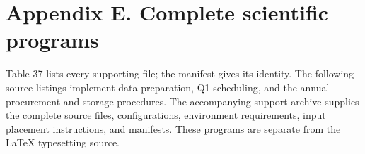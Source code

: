 \endgroup

\clearpage

\section*{Appendix E. Complete scientific programs}\label{appendix-e.-complete-scientific-programs}

Table 37 lists every supporting file; the manifest gives its identity. The following source listings implement data preparation, Q1 scheduling, and the annual procurement and storage procedures. The accompanying support archive supplies the complete source files, configurations, environment requirements, input placement instructions, and manifests. These programs are separate from the LaTeX typesetting source.


